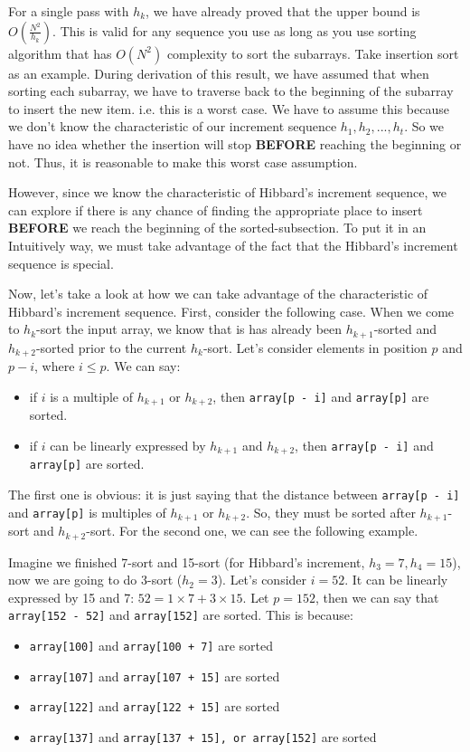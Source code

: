 \documentclass[11pt]{book}
\begin{document}
For a single pass with \(h_k\), we have already proved that the upper bound is \(O(\frac {N^2} {h_k})\). This is valid for any sequence you use as long as you use sorting algorithm that has \(O(N^2)\) complexity to sort the subarrays. Take insertion sort as an example. During derivation of this result, we have assumed that when sorting each subarray, we have to traverse back to the beginning of the subarray to insert the new item. i.e. this is a worst case. We have to assume this because we don't know the characteristic of our increment sequence \(h_1, h_2, ..., h_t\). So we have no idea whether the insertion will stop \textbf{BEFORE} reaching the beginning or not. Thus, it is reasonable to make this worst case assumption.

However, since we know the characteristic of Hibbard's increment sequence, we can explore if there is any chance of finding the appropriate place to insert \textbf{BEFORE} we reach the beginning of the sorted-subsection. To put it in an Intuitively way, we must take advantage of the fact that the Hibbard's increment sequence is special.

Now, let's take a look at how we can take advantage of the characteristic of Hibbard's increment sequence. First, consider the following case. When we come to \(h_k\)-sort the input array, we know that is has already been \(h_{k + 1}\)-sorted and \(h_{k + 2}\)-sorted prior to the current \(h_k\)-sort. Let's consider elements in position \(p\) and \(p - i\), where \(i \leq p\). We can say:
\begin{itemize}
\item if \(i\) is a multiple of \(h_{k + 1}\) or \(h_{k + 2}\), then \texttt{array[p - i]} and \texttt{array[p]} are sorted.
\item if \(i\) can be linearly expressed by \(h_{k + 1}\) and \(h_{k + 2}\), then \texttt{array[p - i]} and \texttt{array[p]} are sorted.
\end{itemize}

The first one is obvious: it is just saying that the distance between \texttt{array[p - i]} and \texttt{array[p]} is multiples of \(h_{k + 1}\) or \(h_{k + 2}\). So, they must be sorted after \(h_{k + 1}\)-sort and \(h_{k + 2}\)-sort. For the second one, we can see the following example.

Imagine we finished 7-sort and 15-sort (for Hibbard's increment, \(h_3 = 7, h_4 = 15\)), now we are going to do 3-sort (\(h_2 = 3\)). Let's consider \(i = 52\). It can be linearly expressed by 15 and 7: \(52 = 1 \times 7 + 3 \times 15\). Let \(p = 152\), then we can say that \texttt{array[152 - 52]} and \texttt{array[152]} are sorted. This is because:
\begin{itemize}
\item \texttt{array[100]} and \texttt{array[100 + 7]} are sorted
\item \texttt{array[107]} and \texttt{array[107 + 15]} are sorted
\item \texttt{array[122]} and \texttt{array[122 + 15]} are sorted
\item \texttt{array[137]} and \texttt{array[137 + 15], or array[152]} are sorted
\end{itemize}
\end{document}
